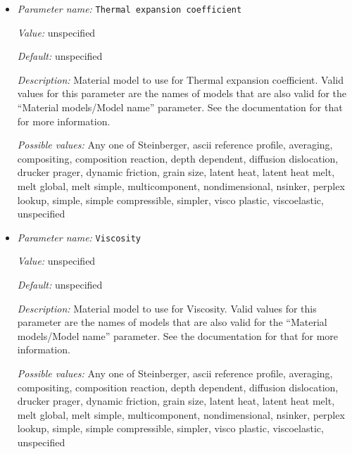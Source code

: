 \begin{itemize}
{\it Possible values:} Any one of Steinberger, ascii reference profile, averaging, compositing, composition reaction, depth dependent, diffusion dislocation, drucker prager, dynamic friction, grain size, latent heat, latent heat melt, melt global, melt simple, multicomponent, nondimensional, nsinker, perplex lookup, simple, simple compressible, simpler, visco plastic, viscoelastic, unspecified
\item {\it Parameter name:} {\tt Thermal expansion coefficient}
\label{parameters:Material model/Compositing/Thermal expansion coefficient}
\label{parameters:Material_20model/Compositing/Thermal_20expansion_20coefficient}


{\it Value:} unspecified


{\it Default:} unspecified


{\it Description:} Material model to use for Thermal expansion coefficient. Valid values for this parameter are the names of models that are also valid for the ``Material models/Model name'' parameter. See the documentation for that for more information.


{\it Possible values:} Any one of Steinberger, ascii reference profile, averaging, compositing, composition reaction, depth dependent, diffusion dislocation, drucker prager, dynamic friction, grain size, latent heat, latent heat melt, melt global, melt simple, multicomponent, nondimensional, nsinker, perplex lookup, simple, simple compressible, simpler, visco plastic, viscoelastic, unspecified
\item {\it Parameter name:} {\tt Viscosity}
\label{parameters:Material model/Compositing/Viscosity}
\label{parameters:Material_20model/Compositing/Viscosity}


{\it Value:} unspecified


{\it Default:} unspecified


{\it Description:} Material model to use for Viscosity. Valid values for this parameter are the names of models that are also valid for the ``Material models/Model name'' parameter. See the documentation for that for more information.


{\it Possible values:} Any one of Steinberger, ascii reference profile, averaging, compositing, composition reaction, depth dependent, diffusion dislocation, drucker prager, dynamic friction, grain size, latent heat, latent heat melt, melt global, melt simple, multicomponent, nondimensional, nsinker, perplex lookup, simple, simple compressible, simpler, visco plastic, viscoelastic, unspecified
\end{itemize}

